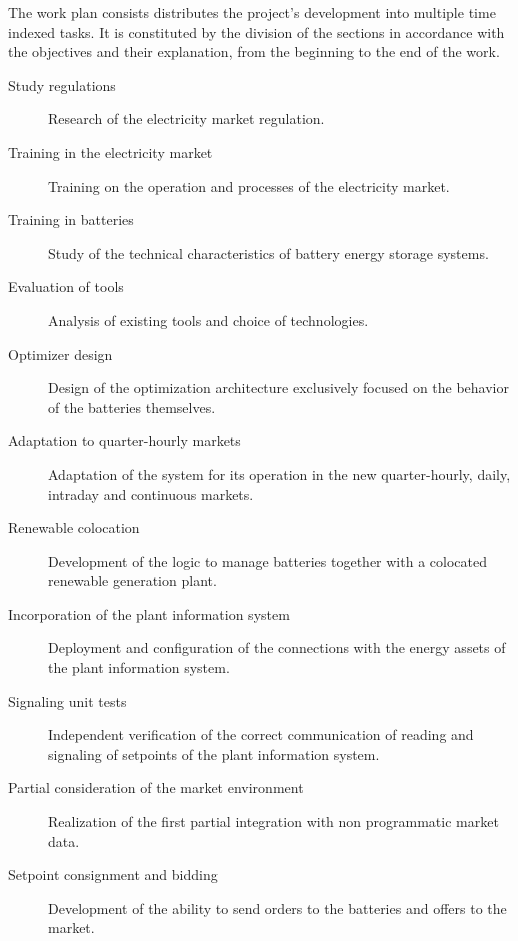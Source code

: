 The work plan consists distributes the project's development into multiple time indexed tasks. It is constituted by the division of the sections in accordance with the objectives and their explanation, from the beginning to the end of the work.

\begin{description}

  \item[Study regulations] Research of the electricity market regulation.

  \item[Training in the electricity market] Training on the operation and processes of the electricity market.

  \item[Training in batteries] Study of the technical characteristics of battery energy storage systems.

  \item[Evaluation of tools] Analysis of existing tools and choice of technologies.

  \item[Optimizer design] Design of the optimization architecture exclusively focused on the behavior of the batteries themselves.

  \item[Adaptation to quarter-hourly markets] Adaptation of the system for its operation in the new quarter-hourly, daily, intraday and continuous markets.

  \item[Renewable colocation] Development of the logic to manage batteries together with a colocated renewable generation plant.

  \item[Incorporation of the plant information system] Deployment and configuration of the connections with the energy assets of the plant information system.

  \item[Signaling unit tests] Independent verification of the correct communication of reading and signaling of setpoints of the plant information system.

  \item[Partial consideration of the market environment] Realization of the first partial integration with non programmatic market data.

  \item[Setpoint consignment and bidding] Development of the ability to send orders to the batteries and offers to the market.


\end{description}
